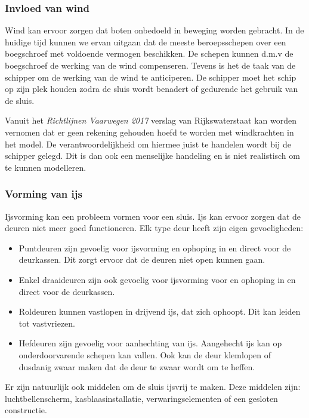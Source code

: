 \documentclass{article}
\begin{document}

\subsubsection{Invloed van wind} %
Wind kan ervoor zorgen dat boten onbedoeld in beweging worden gebracht. In de huidige tijd kunnen we ervan uitgaan dat de meeste beroepsschepen over een boegschroef  met voldoende vermogen beschikken. De schepen kunnen d.m.v de boegschroef de werking van de wind compenseren. Tevens is het de taak van de schipper om de werking van de wind te anticiperen. De schipper moet het schip op zijn plek houden zodra de sluis wordt benadert of gedurende het gebruik van de sluis.

Vanuit het \textit{Richtlijnen Vaarwegen 2017} verslag van Rijkswaterstaat \cite{rijkswaterstaat2017} kan worden vernomen dat er geen rekening gehouden hoefd te worden met windkrachten in het model. De verantwoordelijkheid om hiermee juist te handelen wordt bij de schipper gelegd. Dit is dan ook een menselijke handeling en is niet realistisch om te kunnen modelleren.

\vskip0.5cm

\subsubsection{Vorming van ijs}
Ijsvorming kan een probleem vormen voor een sluis. Ijs kan ervoor zorgen dat de deuren niet meer goed functioneren. Elk type deur heeft zijn eigen gevoeligheden:
\begin{itemize}
\item Puntdeuren zijn gevoelig voor ijsvorming en ophoping in en direct voor de deurkassen. Dit zorgt ervoor dat de deuren niet open kunnen gaan.
\item Enkel draaideuren zijn ook gevoelig voor ijsvorming voor en ophoping in en direct voor de deurkassen.
\item Roldeuren kunnen vastlopen in drijvend ijs, dat zich ophoopt. Dit kan leiden tot vastvriezen.
\item Hefdeuren zijn gevoelig voor aanhechting van ijs. Aangehecht ijs kan op onderdoorvarende schepen kan vallen. Ook kan de deur klemlopen of dusdanig zwaar maken dat de deur te zwaar wordt om te heffen.
\end{itemize}

Er zijn natuurlijk ook middelen om de sluis ijsvrij te maken. Deze middelen zijn: luchtbellenscherm, kasblaasinstallatie, verwaringselementen of een gesloten constructie.
\end{document}
